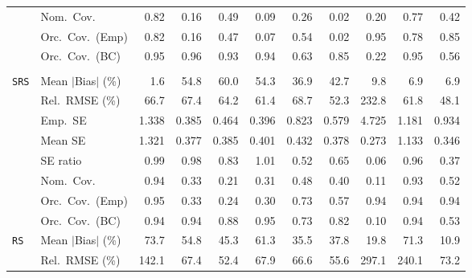 \begin{landscape}
\begin{longtable}{llrrrrrrrrr}
 & Nom.\ Cov. & \cellcolor{rankone}0.82 & 0.16 & \cellcolor{rankthree}0.49 & 0.09 & 0.26 & 0.02 & 0.20 & \cellcolor{ranktwo}0.77 & 0.42 \\
 & Orc.\ Cov.\ (Emp) & \cellcolor{rankthree}0.82 & 0.16 & 0.47 & 0.07 & 0.54 & 0.02 & \cellcolor{rankone}0.95 & 0.78 & \cellcolor{ranktwo}0.85 \\
 & Orc.\ Cov.\ (BC) & \cellcolor{rankone}0.95 & \cellcolor{ranktwo}0.96 & \cellcolor{rankthree}0.93 & \cellcolor{ranktwo}0.94 & 0.63 & 0.85 & 0.22 & \cellcolor{rankone}0.95 & 0.56 \\
\addlinespace[2pt]
\multicolumn{11}{l}{\textbf{Binary \& Categorical Phase-One Covariates}} \\
\addlinespace[2pt]
\quad \texttt{SRS} & Mean $|$Bias$|$ (\%) & \cellcolor{rankone}1.6 & 54.8 & 60.0 & 54.3 & 36.9 & 42.7 & \cellcolor{rankthree}9.8 & \cellcolor{ranktwo}6.9 & \cellcolor{ranktwo}6.9 \\
 & Rel.\ RMSE (\%) & 66.7 & 67.4 & 64.2 & \cellcolor{rankthree}61.4 & 68.7 & \cellcolor{ranktwo}52.3 & 232.8 & 61.8 & \cellcolor{rankone}48.1 \\
 & Emp.\ SE & 1.338 & 0.385 & 0.464 & 0.396 & 0.823 & 0.579 & 4.725 & 1.181 & 0.934 \\
 & Mean SE & 1.321 & 0.377 & 0.385 & 0.401 & 0.432 & 0.378 & 0.273 & 1.133 & 0.346 \\
 & SE ratio & \cellcolor{rankone}0.99 & \cellcolor{ranktwo}0.98 & 0.83 & \cellcolor{rankone}1.01 & 0.52 & 0.65 & 0.06 & \cellcolor{rankthree}0.96 & 0.37 \\
 & Nom.\ Cov. & \cellcolor{rankone}0.94 & 0.33 & 0.21 & 0.31 & 0.48 & 0.40 & 0.11 & \cellcolor{ranktwo}0.93 & \cellcolor{rankthree}0.52 \\
 & Orc.\ Cov.\ (Emp) & \cellcolor{rankone}0.95 & 0.33 & 0.24 & 0.30 & \cellcolor{rankthree}0.73 & 0.57 & \cellcolor{ranktwo}0.94 & \cellcolor{ranktwo}0.94 & \cellcolor{ranktwo}0.94 \\
 & Orc.\ Cov.\ (BC) & \cellcolor{ranktwo}0.94 & \cellcolor{ranktwo}0.94 & \cellcolor{rankthree}0.88 & \cellcolor{rankone}0.95 & 0.73 & 0.82 & 0.10 & \cellcolor{ranktwo}0.94 & 0.53 \\
\addlinespace[2pt]
\quad \texttt{RS} & Mean $|$Bias$|$ (\%) & 73.7 & 54.8 & 45.3 & 61.3 & \cellcolor{rankthree}35.5 & 37.8 & \cellcolor{ranktwo}19.8 & 71.3 & \cellcolor{rankone}10.9 \\
 & Rel.\ RMSE (\%) & 142.1 & 67.4 & \cellcolor{rankone}52.4 & 67.9 & \cellcolor{rankthree}66.6 & \cellcolor{ranktwo}55.6 & 297.1 & 240.1 & 73.2 \\

\end{longtable}
\end{landscape}
